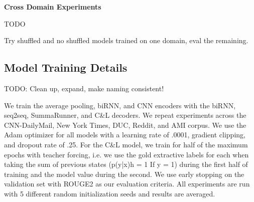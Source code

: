 \textbf{Cross Domain Experiments}

TODO

Try shuffled and no shuffled models trained on one domain, eval the remaining.











\subsection{Model Training Details}

TODO: Clean up, expand, make naming consistent!

We train the average pooling, biRNN, and CNN encoders with the biRNN, 
seq2seq, SummaRunner, and C\&L decoders. We repeat experiments across the 
CNN-DailyMail, New York Times, DUC, Reddit, and AMI corpus. 
We use the Adam optimizer for all models with a learning rate of .0001, 
gradient clipping, and dropout rate of .25. 
For the C\&L model, we train for half of the maximum epochs with teacher 
forcing, i.e. we use the gold extractive labels for each when taking the sum 
of previous states (p(y|x)h = 1 If y = 1) during the first half of training 
and the model value during the second. We use early stopping on the validation
set with ROUGE2 as our evaluation criteria. All experiments are run with 5 
different random initialization seeds and results are averaged.




